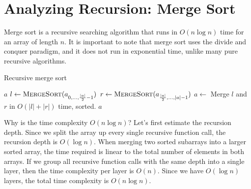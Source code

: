 \documentclass{article}
\begin{document}
    \section{Analyzing Recursion: Merge Sort}
    Merge sort is a recursive searching algorithm that runs in $O(n\log n)$ time for an array of length $n$. It is important to note that merge sort uses the divide and conquer paradigm, and it does not run in exponential time, unlike many pure recursive algorithms.

    \begin{algorithm}
        \caption{Recursive merge sort}
        \begin{algorithmic}[1]
                    \State \Return $a$
                \Else
                    \State $l \gets \Call{MergeSort}{a_{0, \ldots{}, \frac{|a|}{2} - 1}}$
                    \State $r \gets \Call{MergeSort}{a_{\frac{|a|}{2}, \ldots{}, |a| - 1}}$
                    \State $a \gets$ Merge $l$ and $r$ in $O(|l| + |r|)$ time, sorted.
                    \State \Return $a$
                \EndIf
            \EndFunction
        \end{algorithmic}
    \end{algorithm}

    Why is the time complexity $O(n\log n)$? Let's first estimate the recursion depth. Since we split the array up every single recursive function call, the recursion depth is $O(\log n)$. When merging two sorted subarrays into a larger sorted array, the time required is linear to the total number of elements in both arrays. If we group all recursive function calls with the same depth into a single layer, then the time complexity per layer is $O(n)$. Since we have $O(\log n)$ layers, the total time complexity is $O(n\log n)$.
\end{document}
